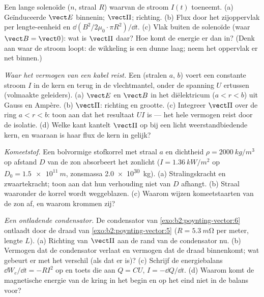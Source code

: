 \begin{exercise}[$\star\star$]\label{exo:b2:poynting-vector:7}
Een lange solenoïde ($n$, straal $R$) waarvan de stroom $I(t)$ toeneemt. (a)
Geïnduceerde $\vect E$ binnenin; $\vect\Pi$; richting. (b) Flux door het
zijoppervlak per lengte-eenheid en $\dd(B^2/2\mu_0\cdot\pi R^2)/\dd t$. (c)
Vlak buiten de solenoïde (waar $\vect B = \vect 0$): wat is $\vect\Pi$ daar?
Hoe
komt de energie er dan in? (Denk aan waar de stroom loopt: de wikkeling is
een dunne laag; neem het oppervlak er net binnen.)
\end{exercise}

\begin{exercise}[$\star\star$]\label{exo:b2:poynting-vector:8}
\emph{Waar het vermogen van een kabel reist.} Een  (stralen $a$,
$b$) voert een constante stroom $I$ in de kern en terug in de vlechtmantel,
onder de spanning $U$ ertussen (volmaakte geleiders). (a) $\vect E$ en
$\vect B$ in het diëlektricum ($a < r < b$) uit Gauss en Ampère. (b)
$\vect\Pi$: richting en grootte. (c) Integreer $\vect\Pi$ over de ring
$a < r
< b$: toon aan dat het resultaat $UI$ is --- het hele vermogen reist
door de isolatie. (d) Welke kant kantelt $\vect\Pi$ op bij een licht
weerstandbiedende kern, en waaraan is haar flux de kern in gelijk?
\end{exercise}

\begin{exercise}[$\star\star$]\label{exo:b2:poynting-vector:9}
\emph{Komeetstof.} Een bolvormige stofkorrel met straal $a$ en dichtheid
$\rho = \qty{2000}{kg/m^3}$ op afstand $D$ van de zon absorbeert het
zonlicht ($I = \qty{1.36}{kW/m^2}$ op $D_0 = \qty{1.5e11}{m}$, zonsmassa
\qty{2.0e30}{kg}). (a) Stralingskracht en zwaartekracht; toon aan dat hun
verhouding niet van $D$ afhangt. (b) Straal waaronder de korrel wordt
weggeblazen. (c) Waarom wijzen komeetstaarten van de zon af, en waarom
krommen zij?
\end{exercise}

\begin{exercise}[$\star\star\star$]\label{exo:b2:poynting-vector:10}
\emph{Een ontladende condensator.} De condensator van
\cref{exo:b2:poynting-vector:6} ontlaadt door de draad van
\cref{exo:b2:poynting-vector:5} ($R = \qty{5.3}{m\ohm}$ per meter, lengte
$L$). (a) Richting van $\vect\Pi$ aan de rand van de condensator nu. (b)
Vermogen dat de condensator verlaat en vermogen dat de draad binnenkomt; wat
gebeurt er met het verschil (als dat er is)? (c) Schrijf de energiebalans
$\dd W_e/\dd t = -RI^2$ op en toets die aan $Q = CU$, $I = -\dd Q/\dd t$.
(d) Waarom komt de magnetische energie van de kring in het begin en op het
eind niet in de balans voor?
\end{exercise}

